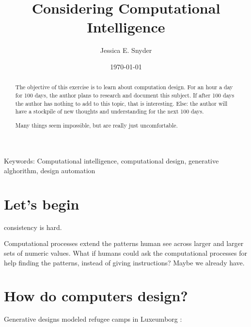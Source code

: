 \documentclass[a4paper,11pt]{article}
\begin{document}
\title{Considering Computational Intelligence}
\author{Jessica E. Snyder}
\date{\today}
\maketitle

\begin{abstract}
The objective of this exercise is to learn about computation design. For an hour a day for 100 days, the author plans to research and document this subject. If after 100 days the author has nothing to add to this topic, that is interesting. Else: the author will have a stockpile of new thoughts and understanding for the next 100 days.

Many things seem impossible, but are really just uncomfortable.

\end{abstract}

Keywords: Computational intelligence, computational design, generative alghorithm, design automation

\tableofcontents

\section{Let's begin}
consistency is hard. 

Computational processes extend the patterns human see across larger and larger sets of numeric values. What if humans could ask the computational processes for help finding the patterns, instead of giving instructions? Maybe we already have.

\section{How do computers design?}

Generative designs modeled refugee camps in Luxeumborg \cite{daher2017data}:
\end{document}
